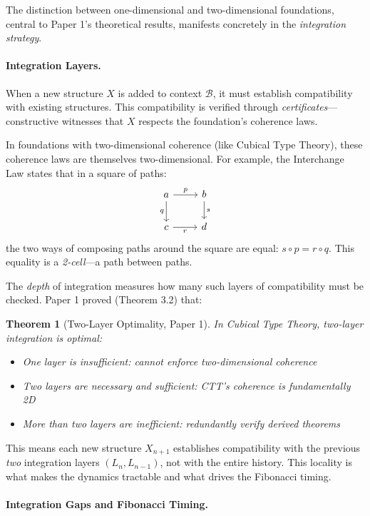 \documentclass[11pt]{article}
\newtheorem{theorem}{Theorem}[section]
\theoremstyle{definition}
\begin{document}
The distinction between one-dimensional and two-dimensional foundations, central to Paper 1's theoretical results, manifests concretely in the \emph{integration strategy}.

\paragraph{Integration Layers.}

When a new structure $X$ is added to context $\mathcal{B}$, it must establish compatibility with existing structures. This compatibility is verified through \emph{certificates}—constructive witnesses that $X$ respects the foundation's coherence laws.

In foundations with two-dimensional coherence (like Cubical Type Theory), these coherence laws are themselves two-dimensional. For example, the Interchange Law states that in a square of paths:
\[
\begin{tikzcd}
a \arrow[r, "p"] \arrow[d, "q"'] & b \arrow[d, "s"] \\
c \arrow[r, "r"'] & d
\end{tikzcd}
\]
the two ways of composing paths around the square are equal: $s \circ p = r \circ q$. This equality is a \emph{2-cell}—a path between paths.

The \emph{depth} of integration measures how many such layers of compatibility must be checked. Paper 1 proved (Theorem 3.2) that:
\begin{theorem}[Two-Layer Optimality, Paper 1]
In Cubical Type Theory, two-layer integration is optimal:
\begin{itemize}
\item One layer is insufficient: cannot enforce two-dimensional coherence
\item Two layers are necessary and sufficient: CTT's coherence is fundamentally 2D
\item More than two layers are inefficient: redundantly verify derived theorems
\end{itemize}
\end{theorem}

This means each new structure $X_{n+1}$ establishes compatibility with the previous \emph{two} integration layers $(L_n, L_{n-1})$, not with the entire history. This locality is what makes the dynamics tractable and what drives the Fibonacci timing.

\paragraph{Integration Gaps and Fibonacci Timing.}
\end{document}
